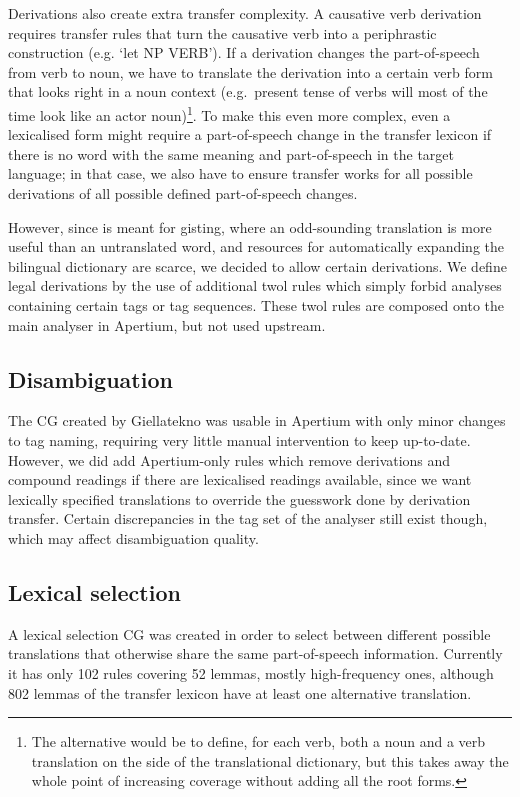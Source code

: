 Derivations also create extra transfer complexity. A causative verb
derivation requires transfer rules that turn the causative verb into a
periphrastic construction (e.g. `let NP VERB'). If a derivation
changes the part-of-speech from verb to noun, we have to translate the
derivation into a certain verb form that looks right in a noun context
(e.g.~present tense of \nob verbs will most of the time look like an
actor noun)\footnote{The alternative would be to define, for each \sme{}
  verb, both a noun and a verb translation on the \nob side of the
  translational dictionary, but this takes away the whole point of
  increasing coverage without adding all the root forms.}. To make
this even more complex, even a lexicalised form might require a
part-of-speech change in the transfer lexicon if there is no word with
the same meaning and part-of-speech in the target language; in that
case, we also have to ensure transfer works for all possible
derivations of all possible defined part-of-speech changes.

However, since \smenob{} is meant for gisting, where an odd-sounding
translation is more useful than an untranslated word, and resources
for automatically expanding the bilingual dictionary are scarce, we
decided to allow certain derivations. We define legal derivations by
the use of additional twol rules which simply forbid analyses
containing certain tags or tag sequences. These twol rules are
composed onto the main analyser in Apertium, but not used upstream.

\subsection{Disambiguation}
The CG created by Giellatekno was usable in Apertium with only minor
changes to tag naming, requiring very little manual intervention to
keep up-to-date. However, we did add Apertium-only rules which remove
derivations and compound readings if there are lexicalised readings
available, since we want lexically specified translations to override
the guesswork done by derivation transfer. Certain discrepancies in
the tag set of the analyser still exist though, which may affect
disambiguation quality.

\subsection{Lexical selection}
A lexical selection CG was created in order to select between
different possible translations that otherwise share the same
part-of-speech information. Currently it has only 102 rules covering
52 lemmas, mostly high-frequency ones, although 802 lemmas of the
transfer lexicon have at least one alternative translation. %

